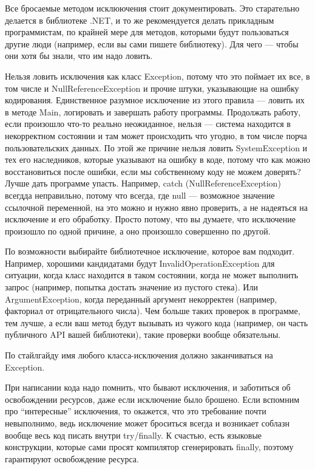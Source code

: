\documentclass[a5paper]{article}
\begin{document}
Все бросаемые методом исклюючения стоит документировать. Это старательно делается в библиотеке .NET, и то же рекомендуется делать прикладным программистам, по крайней мере для методов, которыми будут пользоваться другие люди (например, если вы сами пишете библиотеку). Для чего --- чтобы они хотя бы знали, что им надо ловить.

Нельзя ловить исключения как класс Exception, потому что это поймает их все, в том числе и NullReferenceException и прочие штуки, указывающие на ошибку кодирования. Единственное разумное исключение из этого правила --- ловить их в методе Main, логировать и завершать работу программы. Продолжать работу, если произошло что-то реально неожиданное, нельзя --- система находится в некорректном состоянии и там может происходить что угодно, в том числе порча пользовательских данных. По этой же причине нельзя ловить SystemException и тех его наследников, которые указывают на ошибку в коде, потому что как можно восстановиться после ошибки, если мы собственному коду не можем доверять? Лучше дать программе упасть. Например, catch (NullReferenceException) всегдда неправильно, потому что всегда, где null --- возможное значение ссылочной переменной, на это можно и нужно явно проверить, а не надеяться на исключение и его обработку. Просто потому, что вы думаете, что исключение произошло по одной причине, а оно произошло совершенно по другой.

По возможности выбирайте библиотечное исключение, которое вам подходит. Например, хорошими кандидатами будут InvalidOperationException для ситуации, когда класс находится в таком состоянии, когда не может выполнить запрос (например, попытка достать значение из пустого стека). Или ArgumentException, когда переданный аргумент некорректен (например, факториал от отрицательного числа). Чем больше таких проверок в программе, тем лучше, а если ваш метод будут вызывать из чужого кода (например, он часть публичного API вашей библиотеки), такие проверки вообще обязательны.

По стайлгайду имя любого класса-исключения должно заканчиваться на Exception.

При написании кода надо помнить, что бывают исключения, и заботиться об освобождении ресурсов, даже если исключение было брошено. Если вспомним про ``интересные'' исключения, то окажется, что это требование почти невыполнимо, ведь исключение может броситься всегда и возникает соблазн вообще весь код писать внутри try/finally. К счастью, есть языковые конструкции, которые сами просят компилятор сгенерировать finally, поэтому гарантируют освобождение ресурса.
\end{document}
